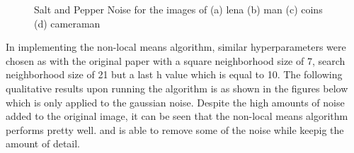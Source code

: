 \documentclass[conference]{IEEEtran}
\begin{document}
    \begin{figure}[htbp]
        \centering
        \caption{Salt and Pepper Noise for the images of (a) lena (b) man (c) coins (d) cameraman}
    \end{figure}

    In implementing the non-local means algorithm, similar hyperparameters were chosen as with the original paper with a square neighborhood size of 7, 
    search neighborhood size of 21 but a last h value which is equal to 10. The following qualitative results upon running the algorithm is as shown in the figures below which
    is only applied to the gaussian noise. Despite the high amounts of noise added to the original image, it can be seen that the non-local means algorithm performs pretty well. 
    and is able to remove some of the noise while keepig the amount of detail.
\end{document}
